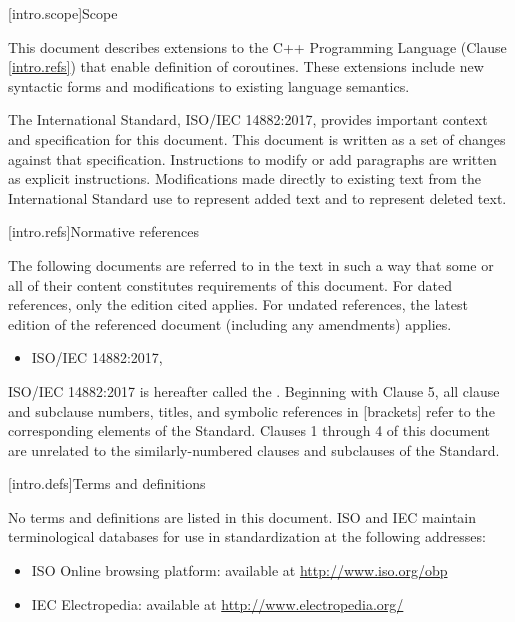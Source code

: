 
[intro.scope]{Scope}

\pnum
This document describes extensions to the C++ 
Programming Language (Clause \ref{intro.refs}) that
enable definition of coroutines. These extensions include 
new syntactic forms and modifications to existing language semantics.

\pnum
The International Standard, ISO/IEC 14882:2017, provides important context
and specification for this document. This document is 
written as a set of changes against that specification. Instructions
to modify or add paragraphs are written as explicit instructions. 
Modifications made directly to existing text from the International
Standard use  to represent added text and
 to represent deleted text. 

\begingroup
\renewcommand{\cleardoublepage}{}
\renewcommand{\clearpage}{}
[intro.refs]{Normative references}
\endgroup

\pnum
The following documents are referred to in the text in such a way that some or all of their content constitutes requirements of this document. For dated references, only the edition cited applies. For undated references, the latest edition of the referenced document (including any amendments) applies.

\begin{itemize}
	\item ISO/IEC 14882:2017, 
\end{itemize}

ISO/IEC 14882:2017 is hereafter called the .
%
Beginning with Clause 5, all clause and subclause numbers, titles,
and symbolic references in [brackets] refer to the corresponding elements of the \Cpp Standard. Clauses 1 through 4 of this document
are unrelated to the similarly-numbered clauses and subclauses of the \Cpp Standard.


\begingroup
\renewcommand{\cleardoublepage}{}
\renewcommand{\clearpage}{}
[intro.defs]{Terms and definitions}
\endgroup

No terms and definitions are listed in this document.
ISO and IEC maintain terminological databases for use in standardization at the following addresses:

\begin{itemize}
	\item ISO Online browsing platform: available at \url{http://www.iso.org/obp}
	\item IEC Electropedia: available at \url{http://www.electropedia.org/}
\end{itemize}

